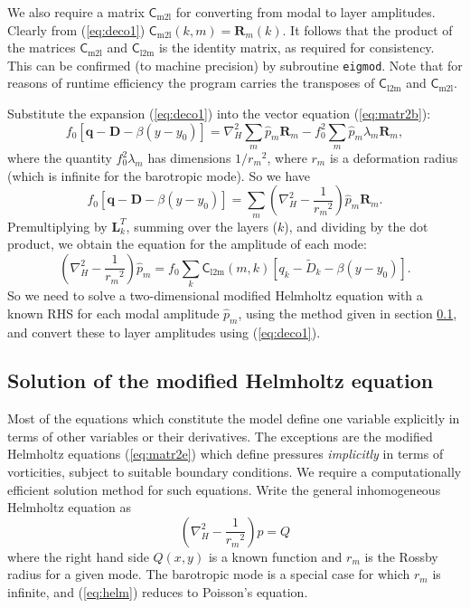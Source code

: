 \documentclass[11pt, a4paper,twoside]{article}
\newcommand{\rdm}[0]{{r_m}}
\newcommand{\vc}[1]{\mathbf{#1}}
\newcommand{\mtx}[1]{\vc{\mathsf{#1}}}
\newcommand{\cml}[0]{\mtx{C}_{\mathrm{m2l}}}
\newcommand{\clm}[0]{\mtx{C}_{\mathrm{l2m}}}
\newcommand{\Dt}[1]{\vc{{}^{#1}\vc{D}}}
\numberwithin{equation}{section}
\begin{document}
We also require a matrix $\cml$ for converting from modal to layer
amplitudes.
Clearly from (\ref{eq:deco1}) $\cml (k,m) =  \vc{R}_m(k)$.
It follows that the product of the matrices $\cml$ and $\clm$  is the identity matrix, as required for consistency.
This can be confirmed (to machine precision) by subroutine \verb=eigmod=.
Note that  for reasons of runtime efficiency the program carries the transposes of  $\clm$ and $\cml$.

Substitute the expansion (\ref{eq:deco1}) into the vector equation (\ref{eq:matr2b}):
\begin{equation}\label{eq:matr2c}
f_0 [\vc{q} -\Dt{} - \beta(y-y_0) ] =  \nabla_H^2  \sum_m \hat{p}_m  \vc{R}_m  - f_0^2 \sum_m \hat{p}_m  \lambda_m \vc{R}_m,
\end{equation}
where the quantity $f_0^2 \lambda_m$ has dimensions $1/\rdm^2$, where $\rdm$ is a
deformation radius (which is infinite for the barotropic mode).
So we have
\begin{equation}\label{eq:matr2d}
f_0 [\vc{q} -\Dt{} - \beta(y-y_0)  ] =  \sum_m \left(\nabla_H^2   - \frac{1}{\rdm^2} \right) \hat{p}_m \vc{R}_m.
\end{equation}
Premultiplying by $\vc{L}^T_k$, summing over the layers ($k$), and dividing by the dot product, we obtain the equation for the amplitude of each mode:
\begin{equation}\label{eq:matr2e}
\left(\nabla_H^2   - \frac{1}{\rdm^2} \right) \hat{p}_m = f_0 \sum_k \clm(m,k) [q_k -\tilde{D}_k - \beta(y-y_0) ].
\end{equation}
So we need to solve a two-dimensional modified Helmholtz equation with a known RHS for each modal amplitude $\hat{p}_m$, using the method given in section \ref{sub:helm}, and convert these to layer amplitudes using (\ref{eq:deco1}).

\subsection{Solution of the modified Helmholtz equation}\label{sub:helm}
Most of the equations which constitute the model define one variable explicitly in terms of other variables or their derivatives.
The exceptions are the modified Helmholtz equations (\ref{eq:matr2e}) which define pressures \emph{implicitly} in terms of vorticities, subject to suitable boundary conditions.
We require a computationally efficient solution method for such equations.
Write the general inhomogeneous Helmholtz equation as
\begin{equation}\label{eq:helm}
\left(\nabla_H^2 - \frac{1}{\rdm^2}\right) p = Q
\end{equation}
where the right hand side $ Q(x,y)$ is a known function and $\rdm$ is the Rossby radius for a given mode.
The barotropic mode is a special case for which $\rdm$ is infinite, and (\ref{eq:helm}) reduces to Poisson's equation.
\end{document}
